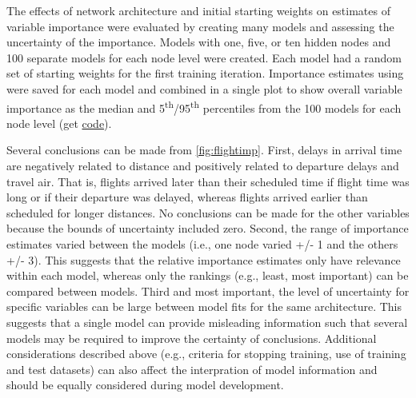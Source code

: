 \documentclass[article,shortnames]{jss}\usepackage[]{graphicx}\usepackage[]{color}
\begin{document}
The effects of network architecture and initial starting weights on estimates of variable importance were evaluated by creating many models and assessing the uncertainty of the importance.  Models with one, five, or ten hidden nodes and 100 separate models for each node level were created.  Each model had a random set of starting weights for the first training iteration.  Importance estimates using  were saved for each model and combined in a single plot to show overall variable importance as the median and 5\textsuperscript{th}/95\textsuperscript{th} percentiles from the 100 models for each node level (get \href{https://raw.githubusercontent.com/fawda123/nnt_manu/master/flightimp.R}{code}). 

Several conclusions can be made from \cref{fig:flightimp}.  First, delays in arrival time are negatively related to distance and positively related to departure delays and travel air.  That is, flights arrived later than their scheduled time if flight time was long or if their departure was delayed, whereas flights arrived earlier than scheduled for longer distances.  No conclusions can be made for the other variables because the bounds of uncertainty included zero.  Second, the range of importance estimates varied between the models (i.e., one node  varied +/- 1 and the others +/- 3).  This suggests that the relative importance estimates only have relevance within each model, whereas only the rankings (e.g., least, most important) can be compared between models.  Third and most important, the level of uncertainty for specific variables can be large between model fits for the same architecture.  This suggests that a single model can provide misleading information such that several models may be required to improve the certainty of conclusions.  Additional considerations described above (e.g., criteria for stopping training, use of training and test datasets) can also affect the interpration of model information and should be equally considered during model development.
\end{document}

